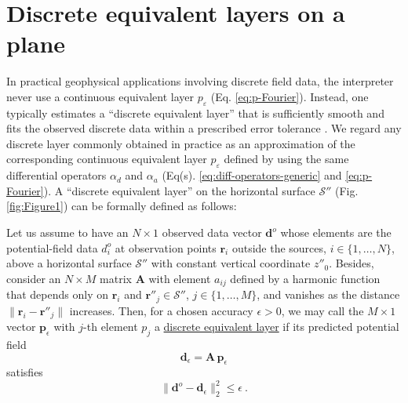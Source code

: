 \section{Discrete equivalent layers on a plane}
\label{eq:planar_eqlayer}

In practical geophysical applications involving discrete field data, 
the interpreter never use a continuous equivalent layer $p_{\varepsilon}$ 
(Eq. \ref{eq:p-Fourier}).
Instead, one typically estimates a ``discrete equivalent layer'' that is 
sufficiently smooth and fits the observed  discrete data within a prescribed error 
tolerance \citep{oliveirajr_etal2026_1}. 
We regard any discrete layer commonly obtained in practice  
as an approximation of the corresponding continuous equivalent layer $p_{\varepsilon}$ 
defined by using the same differential operators $\alpha_{d}$ and $\alpha_{a}$
(Eq(s). \ref{eq:diff-operators-generic} and \ref{eq:p-Fourier}). 
A ``discrete equivalent layer'' on the horizontal surface  
$\mathcal{S}''$ (Fig.  \ref{fig:Figure1}) can be formally defined as follows:  

\begin{definition}
	Let us assume to have an $N \times 1$ observed data vector $\mathbf{d}^{o}$ whose elements 
	are the potential-field data $d^{o}_{i}$ at observation points $\mathbf{r}_{i}$ outside the sources, 
	$i \in \{1, \dots, N\}$, above a horizontal surface $\mathcal{S}''$ with constant vertical 
	coordinate $z''_{0}$. Besides, consider an $N \times M$ 
	matrix $\mathbf{A}$ with element $a_{ij}$ defined by a harmonic function that depends only on $\mathbf{r}_{i}$ 
	and $\mathbf{r}''_{j} \in \mathcal{S}''$, $j \in \{1, \dots, M\}$, and
	vanishes as the distance $\| \mathbf{r}_{i} - \mathbf{r}''_{j} \|$ increases. 
	Then, for a chosen accuracy $\epsilon > 0$, we may call the $M \times 1$ vector $\mathbf{p}_{\epsilon}$ with $j$-th element $p_{j}$ 
	a \underline{discrete equivalent layer} if its predicted potential field 
	\begin{equation}
		\mathbf{d}_{\epsilon} = \mathbf{A} \, \mathbf{p}_{\epsilon}
		\label{eq:predicted-data-discrete-layer}
	\end{equation}
	satisfies 
	\begin{equation}
		\| \mathbf{d}^{o} - \mathbf{d}_{\epsilon} \|_{2}^{2} \le \epsilon \: .
		\label{eq:epsilon-bound-data-discrete}
	\end{equation}
	\label{def:discrete-eqlayer}
\end{definition}

